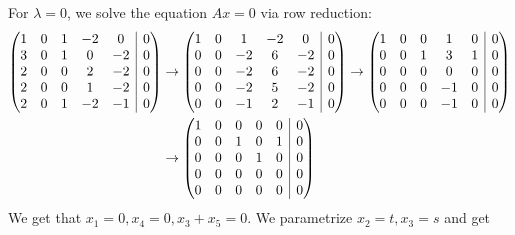 \documentclass{eh-homework}
\begin{document}
\begin{question}{2}
\begin{enumerate}[label=(\alph*)]
        For \(\lambda = 0\), we solve the equation \(Ax = 0\) via row reduction:
        \begin{align*}
            \left( \begin{array}{@{}ccccc|c@{}}
                1 & 0 & 1 & -2 & 0 & 0\\
                3 & 0 & 1 & 0 & -2 & 0\\
                2 & 0 & 0 & 2 & -2 & 0\\
                2 & 0 & 0 & 1 & -2 & 0\\
                2 & 0 & 1 & -2 & -1 & 0 \\
            \end{array} \right) &\to
            \left( \begin{array}{@{}ccccc|c@{}}
                1 & 0 & 1 & -2 & 0 & 0\\
                0 & 0 & -2 & 6 & -2 & 0\\
                0 & 0 & -2 & 6 & -2 & 0\\
                0 & 0 & -2 & 5 & -2 & 0\\
                0 & 0 & -1 & 2 & -1 & 0 \\
            \end{array} \right) \to 
            \left( \begin{array}{@{}ccccc|c@{}}
                1 & 0 & 0 & 1 & 0 & 0\\
                0 & 0 & 1 & 3 & 1 & 0\\
                0 & 0 & 0 & 0 & 0 & 0\\
                0 & 0 & 0 & -1 & 0 & 0\\
                0 & 0 & 0 & -1 & 0 & 0 \\
            \end{array} \right) \\
            &\to \left( \begin{array}{@{}ccccc|c@{}}
                1 & 0 & 0 & 0 & 0 & 0\\
                0 & 0 & 1 & 0 & 1 & 0\\
                0 & 0 & 0 & 1 & 0 & 0\\
                0 & 0 & 0 & 0 & 0 & 0\\
                0 & 0 & 0 & 0 & 0 & 0 \\
            \end{array} \right)
        \end{align*}
        We get that \(x_1 = 0, x_4 = 0, x_3 + x_5 = 0\). We parametrize \(x_2 = t, x_3 = s\) and get

\end{enumerate}
\end{question}
\end{document}
